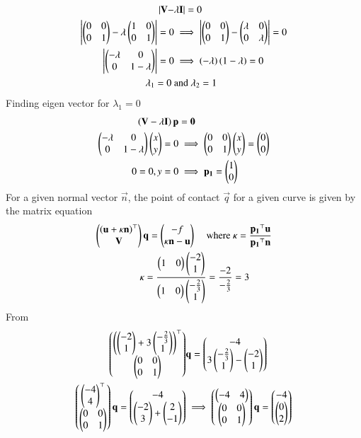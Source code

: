 \documentclass[journal]{IEEEtran}
\begin{document}
    \begin{align}
    |\mathbf{V}-& \lambda\mathbf{I}|=0 \\
    \begin{vmatrix}\begin{pmatrix}0&0\\0&1\end{pmatrix}-\lambda\begin{pmatrix}1&0\\0&1\end{pmatrix}\end{vmatrix}=0 &\implies
    \begin{vmatrix}\begin{pmatrix}0&0\\0&1\end{pmatrix}-\begin{pmatrix}\lambda&0\\0&\lambda\end{pmatrix}\end{vmatrix}=0\\
    \begin{vmatrix}\begin{pmatrix}-\lambda&0\\0&1-\lambda\end{pmatrix}\end{vmatrix}=0 &\implies \left(-\lambda\right)\left(1-\lambda\right)=0 \\
    \lambda_1=0\ &\text{and}\ \lambda_2=1
\end{align}
Finding eigen vector for $\lambda_1=0$
\begin{align}
    \left(\mathbf{V}- \lambda\mathbf{I}\right)\mathbf{p}&=\mathbf{0}\\
    \begin{pmatrix}-\lambda&0\\0&1-\lambda\end{pmatrix}\begin{pmatrix}x\\y\end{pmatrix}=0 &\implies \begin{pmatrix}0&0\\0&1\end{pmatrix}\begin{pmatrix}x\\y\end{pmatrix}=\begin{pmatrix}0\\0\end{pmatrix}\\
     0=0,y=0 &\implies \mathbf{p_1}=\begin{pmatrix}1\\0\end{pmatrix}
\end{align}
For a given normal vector $\vec{n}$, the point of contact $\vec{q}$ for a given curve is given by the matrix equation
\begin{align}
\myvec{\brak{\vec{u}+\kappa\vec{n}}^\top\\\vec{V}}\vec{q}=\myvec{-f\\\kappa\vec{n}-\vec{u}} \quad\ &\text{where}\ \kappa=\frac{\vec{p_1}^\top\vec{u}}{\vec{p_1}^\top\vec{n}} \\
\kappa=\frac{\myvec{1&0}\myvec{-2\\1}}{\myvec{1&0}\myvec{-\frac{2}{3}\\1}}&=\frac{-2}{-\frac{2}{3}}=3
\end{align}
From 
\begin{align}
\begin{pmatrix}\left(\begin{pmatrix}-2\\1\end{pmatrix}+3\begin{pmatrix}-\frac{2}{3}\\1\end{pmatrix}\right)^\top\\\begin{pmatrix}0&0\\0&1\end{pmatrix}\end{pmatrix}&\mathbf{q}=\begin{pmatrix}-4\\3\begin{pmatrix}-\frac{2}{3}\\1\end{pmatrix}-\begin{pmatrix}-2\\1\end{pmatrix}\end{pmatrix} \\
\begin{pmatrix}\begin{pmatrix}-4\\4\end{pmatrix}^\top\\\begin{pmatrix}0&0\\0&1\end{pmatrix}\end{pmatrix}\mathbf{q}=\begin{pmatrix}-4\\\begin{pmatrix}-2\\3\end{pmatrix}+\begin{pmatrix}2\\-1\end{pmatrix}\end{pmatrix} &\implies 
\begin{pmatrix}\begin{pmatrix}-4&4\end{pmatrix}\\\begin{pmatrix}0&0\\0&1\end{pmatrix}\end{pmatrix}\mathbf{q}=\begin{pmatrix}-4\\\begin{pmatrix}0\\2\end{pmatrix}\end{pmatrix}
\end{align}
\end{document}
